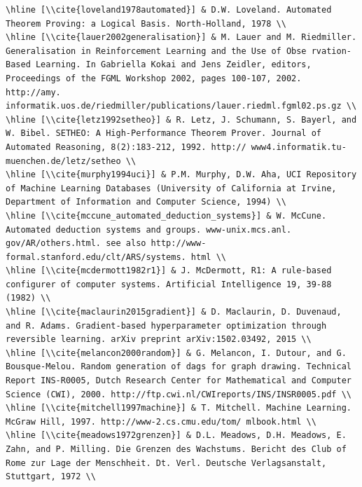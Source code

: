 \documentclass[10pt]{book}
\begin{document}
\begin{verbatim}
\hline [\\cite{loveland1978automated}] & D.W. Loveland. Automated Theorem Proving: a Logical Basis. North-Holland, 1978 \\
\hline [\\cite{lauer2002generalisation}] & M. Lauer and M. Riedmiller. Generalisation in Reinforcement Learning and the Use of Obse rvation-Based Learning. In Gabriella Kokai and Jens Zeidler, editors, Proceedings of the FGML Workshop 2002, pages 100-107, 2002. http://amy. informatik.uos.de/riedmiller/publications/lauer.riedml.fgml02.ps.gz \\
\hline [\\cite{letz1992setheo}] & R. Letz, J. Schumann, S. Bayerl, and W. Bibel. SETHEO: A High-Performance Theorem Prover. Journal of Automated Reasoning, 8(2):183-212, 1992. http:// www4.informatik.tu-muenchen.de/letz/setheo \\
\hline [\\cite{murphy1994uci}] & P.M. Murphy, D.W. Aha, UCI Repository of Machine Learning Databases (University of California at Irvine, Department of Information and Computer Science, 1994) \\
\hline [\\cite{mccune_automated_deduction_systems}] & W. McCune. Automated deduction systems and groups. www-unix.mcs.anl. gov/AR/others.html. see also http://www-formal.stanford.edu/clt/ARS/systems. html \\
\hline [\\cite{mcdermott1982r1}] & J. McDermott, R1: A rule-based configurer of computer systems. Artificial Intelligence 19, 39-88 (1982) \\
\hline [\\cite{maclaurin2015gradient}] & D. Maclaurin, D. Duvenaud, and R. Adams. Gradient-based hyperparameter optimization through reversible learning. arXiv preprint arXiv:1502.03492, 2015 \\
\hline [\\cite{melancon2000random}] & G. Melancon, I. Dutour, and G. Bousque-Melou. Random generation of dags for graph drawing. Technical Report INS-R0005, Dutch Research Center for Mathematical and Computer Science (CWI), 2000. http://ftp.cwi.nl/CWIreports/INS/INSR0005.pdf \\
\hline [\\cite{mitchell1997machine}] & T. Mitchell. Machine Learning. McGraw Hill, 1997. http://www-2.cs.cmu.edu/tom/ mlbook.html \\
\hline [\\cite{meadows1972grenzen}] & D.L. Meadows, D.H. Meadows, E. Zahn, and P. Milling. Die Grenzen des Wachstums. Bericht des Club of Rome zur Lage der Menschheit. Dt. Verl. Deutsche Verlagsanstalt, Stuttgart, 1972 \\

\end{verbatim}
\end{document}
